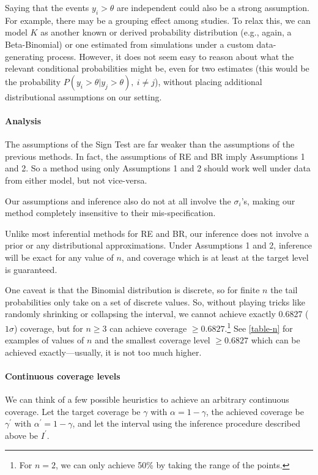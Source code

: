 \documentclass[letterpaper,12pt]{article}
\begin{document}
Saying that the events $y_i>\theta$ are independent could also be a strong assumption. For example, there may be a grouping effect among studies. To relax this, we can model $K$ as another known or derived probability distribution (e.g., again, a Beta-Binomial) or one estimated from simulations under a custom data-generating process. However, it does not seem easy to reason about what the relevant conditional probabilities might be, even for two estimates (this would be the probability $P(y_i>\theta|y_j>\theta),\ i\neq j$), without placing additional distributional assumptions on our setting.

\paragraph{Analysis}\label{analysis}

The assumptions of the Sign Test are far weaker than the assumptions of the previous methods. In fact, the assumptions of RE and BR imply Assumptions 1 and 2. So a method using only Assumptions 1 and 2 should work well under data from either model, but not vice-versa.

Our assumptions and inference also do not at all involve the $\sigma_i$'s, making our method completely insensitive to their mis-specification.

Unlike most inferential methods for RE and BR, our inference does not involve a prior or any distributional approximations. Under Assumptions 1 and 2, inference will be exact for any value of $n$, and coverage which is at least at the target level is guaranteed.

One caveat is that the Binomial distribution is discrete, so for finite $n$ the tail probabilities only take on a set of discrete values. So, without playing tricks like randomly shrinking or collapsing the interval, we cannot achieve exactly 0.6827 ($1\sigma$) coverage, but for $n\geq 3$ can achieve coverage $\geq 0.6827$.\footnote{For $n=2$, we can only achieve 50\% by taking the range of the points.} See \ref{table-n} for examples of values of $n$ and the smallest coverage level $\geq0.6827$ which can be achieved exactly---usually, it is not too much higher.

\paragraph{Continuous coverage levels} We can think of a few possible heuristics to achieve an arbitrary continuous coverage. Let the target coverage be $\gamma$ with $\alpha=1-\gamma$, the achieved coverage be $\gamma^\prime$ with $\alpha^\prime=1-\gamma$, and let the interval using the inference procedure described above be $I^\prime$.
\end{document}
